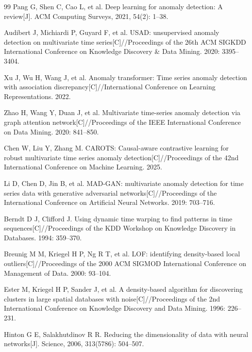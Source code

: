 \documentclass[10.5pt,a4paper,twocolumn]{ctexart}
\begin{document}
\begin{thebibliography}{99}
Pang G, Shen C, Cao L, et al. Deep learning for anomaly detection: A review[J]. ACM Computing Surveys, 2021, 54(2): 1--38.

Audibert J, Michiardi P, Guyard F, et al. USAD: unsupervised anomaly detection on multivariate time series[C]//Proceedings of the 26th ACM SIGKDD International Conference on Knowledge Discovery \& Data Mining. 2020: 3395--3404.

Xu J, Wu H, Wang J, et al. Anomaly transformer: Time series anomaly detection with association discrepancy[C]//International Conference on Learning Representations. 2022.

Zhao H, Wang Y, Duan J, et al. Multivariate time-series anomaly detection via graph attention network[C]//Proceedings of the IEEE International Conference on Data Mining. 2020: 841--850.

Chen W, Liu Y, Zhang M. CAROTS: Causal-aware contrastive learning for robust multivariate time series anomaly detection[C]//Proceedings of the 42nd International Conference on Machine Learning. 2025.

Li D, Chen D, Jin B, et al. MAD-GAN: multivariate anomaly detection for time series data with generative adversarial networks[C]//Proceedings of the International Conference on Artificial Neural Networks. 2019: 703--716.

Berndt D J, Clifford J. Using dynamic time warping to find patterns in time sequences[C]//Proceedings of the KDD Workshop on Knowledge Discovery in Databases. 1994: 359--370.

Breunig M M, Kriegel H P, Ng R T, et al. LOF: identifying density-based local outliers[C]//Proceedings of the 2000 ACM SIGMOD International Conference on Management of Data. 2000: 93--104.

Ester M, Kriegel H P, Sander J, et al. A density-based algorithm for discovering clusters in large spatial databases with noise[C]//Proceedings of the 2nd International Conference on Knowledge Discovery and Data Mining. 1996: 226--231.

Hinton G E, Salakhutdinov R R. Reducing the dimensionality of data with neural networks[J]. Science, 2006, 313(5786): 504--507.

\end{thebibliography}
\end{document}
